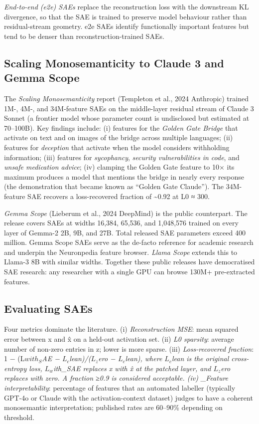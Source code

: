 \documentclass{article}
\begin{document}
\emph{End-to-end (e2e) SAEs} \citep{braun2024identifyingfunctio} replace the reconstruction loss with the downstream KL divergence, so that the SAE is trained to preserve model behaviour rather than residual-stream geometry. e2e SAEs identify functionally important features but tend to be denser than reconstruction-trained SAEs.

\subsection{Scaling Monosemanticity to Claude 3 and Gemma Scope}\label{scaling-monosemanticity-to-claude-3-and-gemma-scope}

The \emph{Scaling Monosemanticity} report (Templeton et al., 2024 Anthropic) trained 1M-, 4M-, and 34M-feature SAEs on the middle-layer residual stream of Claude 3 Sonnet (a frontier model whose parameter count is undisclosed but estimated at 70--100B). Key findings include: (i) features for the \emph{Golden Gate Bridge} that activate on text and on images of the bridge across multiple languages; (ii) features for \emph{deception} that activate when the model considers withholding information; (iii) features for \emph{sycophancy}, \emph{security vulnerabilities in code}, and \emph{unsafe medication advice}; (iv) clamping the Golden Gate feature to 10× its maximum produces a model that mentions the bridge in nearly every response (the demonstration that became known as ``Golden Gate Claude''). The 34M-feature SAE recovers a loss-recovered fraction of \textasciitilde0.92 at L0 ≈ 300.

\emph{Gemma Scope} (Lieberum et al., 2024 DeepMind) is the public counterpart. The release covers SAEs at widths 16,384, 65,536, and 1,048,576 trained on every layer of Gemma-2 2B, 9B, and 27B. Total released SAE parameters exceed 400 million. Gemma Scope SAEs serve as the de-facto reference for academic research and underpin the Neuronpedia feature browser. \emph{Llama Scope} \citep{he2024dictionarylearning} extends this to Llama-3 8B with similar widths. Together these public releases have democratised SAE research: any researcher with a single GPU can browse 130M+ pre-extracted features.

\subsection{Evaluating SAEs}\label{evaluating-saes}

Four metrics dominate the literature. (i) \emph{Reconstruction MSE}: mean squared error between x and x̂ on a held-out activation set. (ii) \emph{L0 sparsity}: average number of non-zero entries in z; lower is more sparse. (iii) \emph{Loss-recovered fraction}: 1 − (L\emph{\(with_S\)AE − \(L_c\)lean)/(\(L_z\)ero − \(L_c\)lean), where \(L_c\)lean is the original cross-entropy loss, \(L_w\)ith\_SAE replaces x with x̂ at the patched layer, and \(L_z\)ero replaces with zero. A fraction ≥0.9 is considered acceptable. (iv) \_Feature interpretability}: percentage of features that an automated labeller (typically GPT-4o or Claude with the activation-context dataset) judges to have a coherent monosemantic interpretation; published rates are 60--90\% depending on threshold.
\end{document}
